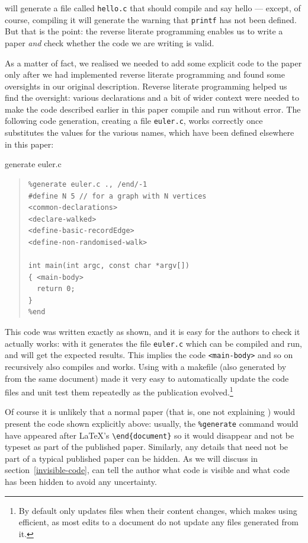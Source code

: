 \documentclass[prodmode,acmtecs]{acmsmall} %
\begin{document}
will generate a file called \texttt{hello.c} that should compile and say hello --- except, of course, compiling it will generate the warning that \texttt{printf} has not been defined. But that is the point: the reverse literate programming enables us to write a paper \emph{and\/} check whether the code we are writing is valid. 

As a matter of fact, we realised we needed to add some explicit code to the paper only after we had implemented reverse literate programming and found some oversights in our original description. Reverse literate programming helped us find the oversight: various declarations and a bit of wider context were needed to make the code described earlier in this paper compile and run without error. The following code generation, creating a file \texttt{euler.c}, works correctly once  substitutes the values for the various names, which have been defined elsewhere in this paper:

\manualrelitindex generate euler.c
\begin{quote}\begin{verbatim}
%generate euler.c ., /end/-1
#define N 5 // for a graph with N vertices
<common-declarations>
<declare-walked>
<define-basic-recordEdge>
<define-non-randomised-walk>

int main(int argc, const char *argv[])
{ <main-body>
  return 0;
}
%end
\end{verbatim}\end{quote}

This code was written exactly as shown, and it is easy for the authors to check it actually works: with  it generates the file \texttt{euler.c} which can be compiled and run, and will get the expected results. This implies the code \verb|<main-body>| and so on recursively also compiles and works. Using  \cite{make} with a makefile (also generated by  from the same document) made it very easy to automatically update the code files and unit test them repeatedly as the publication evolved.\footnote{By default  only updates files when their content changes, which makes using  efficient, as most edits to a document do not update any files generated from it.}

Of course it is unlikely that a normal paper (that is, one not explaining ) would present the code shown explicitly above: usually, the \texttt{\%{}generate} command would have appeared after \LaTeX's \verb|\end{document}| so it would disappear and not be typeset as part of the published paper. Similarly, any details that need not be part of a typical published paper can be hidden. As we will discuss in section~\ref{invisible-code},  can tell the author what code is visible and what code has been hidden to avoid any uncertainty.
\end{document}
